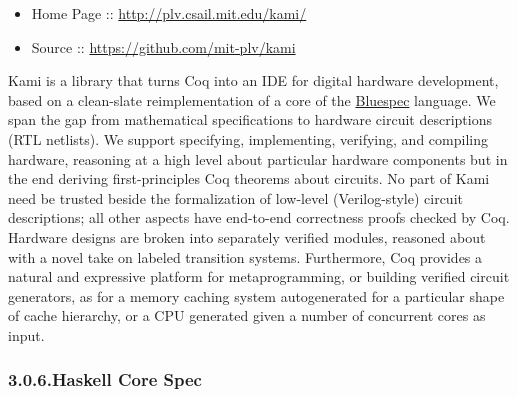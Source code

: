 \documentclass[12pt,twoside]{article}
\begin{document}
\begin{itemize}[noitemsep,topsep=\mdcompacttopsep]%

\item{}Home Page :: \href{http://plv.csail.mit.edu/kami/}{{\ttfamily http://\hspace{0pt}plv.\hspace{0pt}csail.\hspace{0pt}mit.\hspace{0pt}edu/\hspace{0pt}kami/\hspace{0pt}}}%

\item{}Source :: \href{https://github.com/mit-plv/kami}{{\ttfamily https://\hspace{0pt}github.\hspace{0pt}com/\hspace{0pt}mit-\hspace{0pt}plv/\hspace{0pt}kami}}%
\end{itemize}%

\noindent{}Kami is a library that turns Coq into an IDE for digital hardware
development, based on a clean-slate reimplementation of a core of the
\href{http://www.bluespec.com}{Bluespec} language. We span the gap from mathematical specifications to
hardware circuit descriptions (RTL netlists). We support specifying,
implementing, verifying, and compiling hardware, reasoning at a high
level about particular hardware components but in the end deriving
first-principles Coq theorems about circuits. No part of Kami need be
trusted beside the formalization of low-level (Verilog-style) circuit
descriptions; all other aspects have end-to-end correctness proofs
checked by Coq. Hardware designs are broken into separately verified
modules, reasoned about with a novel take on labeled transition
systems. Furthermore, Coq provides a natural and expressive platform
for metaprogramming, or building verified circuit generators, as for a
memory caching system autogenerated for a particular shape of cache
hierarchy, or a CPU generated given a number of concurrent cores as
input.%

\subsubsection{3.0.6.\hspace*{0.5em}Haskell Core Spec}\label{sec-haskell-core-spec}%
\end{document}
